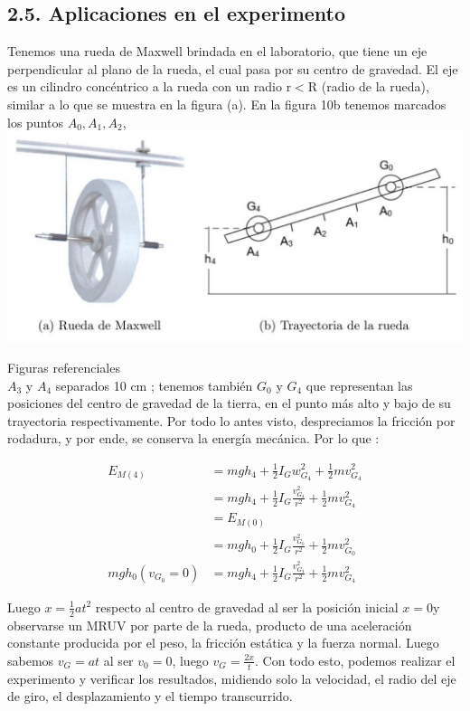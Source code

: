 \documentclass[10pt]{article}
\begin{document}
\subsection*{2.5. Aplicaciones en el experimento}
Tenemos una rueda de Maxwell brindada en el laboratorio, que tiene un eje perpendicular al plano de la rueda, el cual pasa por su centro de gravedad. El eje es un cilindro concéntrico a la rueda con un radio $\mathrm{r}<\mathrm{R}$ (radio de la rueda), similar a lo que se muestra en la figura (a). En la figura 10b tenemos marcados los puntos $A_{0}, A_{1}, A_{2}$,\\
\includegraphics[scale = 0.15, center]{2025_04_01_ea720b93e8ebb5d0c6aeg-09(1)}

Figuras referenciales\\
$A_{3}$ y $A_{4}$ separados 10 cm ; tenemos también $G_{0}$ y $G_{4}$ que representan las posiciones del centro de gravedad de la tierra, en el punto más alto y bajo de su trayectoria respectivamente. Por todo lo antes visto, despreciamos la fricción por rodadura, y por ende, se conserva la energía mecánica. Por lo que :


\begin{align*}
E_{M(4)} & =m g h_{4}+\frac{1}{2} I_{G} w_{G_{4}}^{2}+\frac{1}{2} m v_{G_{4}}^{2}  \tag{6}\\
& =m g h_{4}+\frac{1}{2} I_{G} \frac{v_{G_{4}}^{2}}{r^{2}}+\frac{1}{2} m v_{G_{4}}^{2}  \tag{7}\\
& =E_{M(0)}  \tag{8}\\
& =m g h_{0}+\frac{1}{2} I_{G} \frac{v_{G_{0}}^{2}}{r^{2}}+\frac{1}{2} m v_{G_{0}}^{2}  \tag{9}\\
m g h_{0}\left(v_{G_{0}}=0\right) & =m g h_{4}+\frac{1}{2} I_{G} \frac{v_{G_{4}}^{2}}{r^{2}}+\frac{1}{2} m v_{G_{4}}^{2} \tag{10}
\end{align*}


Luego $x=\frac{1}{2} a t^{2}$ respecto al centro de gravedad al ser la posición inicial $x=0 \mathrm{y}$ observarse un MRUV por parte de la rueda, producto de una aceleración constante producida por el peso, la fricción estática y la fuerza normal. Luego sabemos $v_{G}=a t$ al ser $v_{0}=0$, luego $v_{G}=\frac{2 x}{t}$. Con todo esto, podemos realizar el experimento y verificar los resultados, midiendo solo la velocidad, el radio del eje de giro, el desplazamiento y el tiempo transcurrido.
\end{document}
